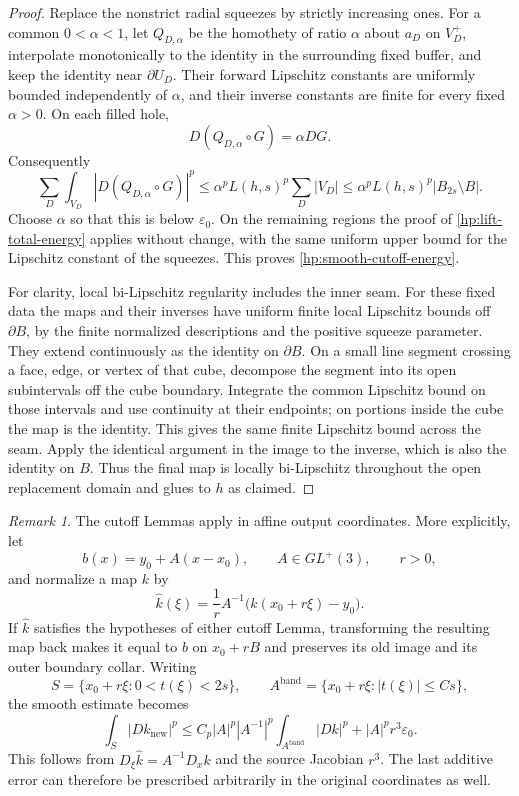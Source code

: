 \documentclass[11pt]{article}
\numberwithin{equation}{section}
\theoremstyle{definition}
\theoremstyle{remark}
\newtheorem{remark}[theorem]{Remark}
\begin{document}
\begin{proof}
Replace the nonstrict radial squeezes by strictly increasing ones.
For a common $0<\alpha<1$, let $Q_{D,\alpha}$ be the homothety of
ratio $\alpha$ about $a_D$ on $V_D^+$, interpolate monotonically to
the identity in the surrounding fixed buffer, and keep the identity
near $\partial U_D$.  Their forward Lipschitz constants are uniformly
bounded independently of $\alpha$, and their inverse constants are
finite for every fixed $\alpha>0$.  On each filled hole,
\[
 D(Q_{D,\alpha}\circ G)=\alpha DG.
\]
Consequently
\[
 \sum_D\int_{V_D}|D(Q_{D,\alpha}\circ G)|^p
 \leq\alpha^pL(h,s)^p\sum_D|V_D|
 \leq\alpha^pL(h,s)^p|B_{2s}\setminus B|.
\]
Choose $\alpha$ so that this is below $\varepsilon_0$.  On the
remaining regions the proof of
\eqref{hp:lift-total-energy} applies without change, with the same
uniform upper bound for the Lipschitz constant of the squeezes.
This proves \eqref{hp:smooth-cutoff-energy}.

For clarity, local bi-Lipschitz regularity includes the inner seam.
For these fixed data the maps and their inverses have uniform finite
local Lipschitz bounds off $\partial B$, by the finite normalized
descriptions and the positive squeeze parameter.  They extend
continuously as the identity on $\partial B$.  On a small line
segment crossing a face, edge, or vertex of that cube, decompose the
segment into its open subintervals off the cube boundary.  Integrate
the common Lipschitz bound on those intervals and use continuity at
their endpoints; on portions inside the cube the map is the identity.
This gives the same finite Lipschitz bound across the seam.  Apply
the identical argument in the image to the inverse, which is also
the identity on $B$.  Thus the final map is locally bi-Lipschitz
throughout the open replacement domain and glues to $h$ as claimed.
\end{proof}

\begin{remark}\label{hp:cutoff-affine-scaling}
The cutoff Lemmas apply in affine output coordinates.  More
explicitly, let
\[
 b(x)=y_0+A(x-x_0),\qquad A\in GL^+(3),\qquad r>0,
\]
and normalize a map $k$ by
\[
 \widehat k(\xi)
 =\frac1r A^{-1}\bigl(k(x_0+r\xi)-y_0\bigr).
\]
If $\widehat k$ satisfies the hypotheses of either cutoff Lemma,
transforming the resulting map back makes it equal to $b$ on
$x_0+rB$ and preserves its old image and its outer boundary collar.
Writing
\[
 S=\{x_0+r\xi:0<t(\xi)<2s\},\qquad
 A^{\mathrm{band}}=\{x_0+r\xi:|t(\xi)|\leq Cs\},
\]
the smooth estimate becomes
\begin{equation}\label{hp:affine-cutoff-energy}
 \int_S|Dk_{\mathrm{new}}|^p
 \leq C_p|A|^p|A^{-1}|^p
          \int_{A^{\mathrm{band}}}|Dk|^p
       +|A|^pr^3\varepsilon_0.
\end{equation}
This follows from $D_\xi\widehat k=A^{-1}D_xk$ and the source
Jacobian $r^3$.  The last additive error can therefore be prescribed
arbitrarily in the original coordinates as well.
\end{remark}
\end{document}
